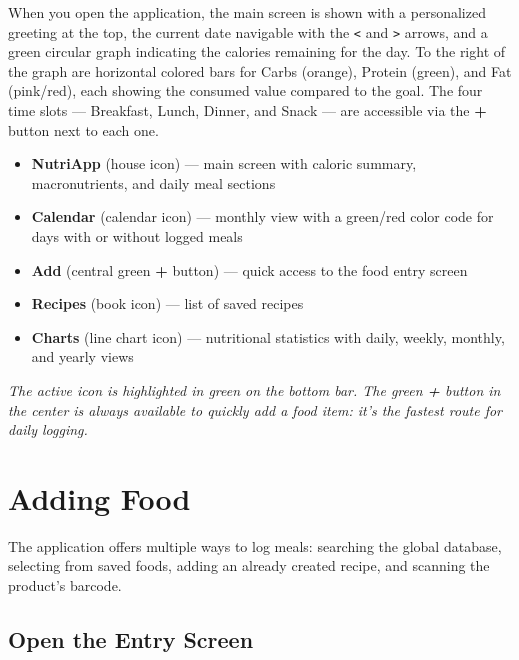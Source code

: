 \documentclass[a4paper,12pt]{article}
\newcommand{\labelgreen}[1]{\medskip\noindent{\color{nutriaccent}\textbf{#1}}\par\smallskip}
\newcommand{\suggerimento}[1]{%
  \smallskip\noindent\textit{\color{nutrigray}#1}\par\smallskip%
}
\begin{document}
\labelgreen{Description}
When you open the application, the main screen is shown with a
personalized greeting at the top, the current date navigable with the \texttt{<} and \texttt{>} arrows,
and a green circular graph indicating the calories remaining for the day.
To the right of the graph are horizontal colored bars for Carbs (orange),
Protein (green), and Fat (pink/red), each showing the consumed value compared to the goal.
The four time slots --- Breakfast, Lunch, Dinner, and Snack --- are
accessible via the \textbf{+} button next to each one.

\labelgreen{Bar Elements}
\begin{itemize}[leftmargin=1.4em, itemsep=2pt]
  \item \textbf{NutriApp} (house icon) --- main screen with caloric
        summary, macronutrients, and daily meal sections
  \item \textbf{Calendar} (calendar icon) --- monthly view with a green/red color
        code for days with or without logged meals
  \item \textbf{Add} (central green \textbf{+} button) --- quick access
        to the food entry screen
  \item \textbf{Recipes} (book icon) --- list of saved recipes
  \item \textbf{Charts} (line chart icon) --- nutritional statistics
        with daily, weekly, monthly, and yearly views
\end{itemize}

\suggerimento{The active icon is highlighted in green on the bottom bar.
The green \textbf{+} button in the center is always available to quickly add
a food item: it's the fastest route for daily logging.}

\newpage

\section{Adding Food}

The application offers multiple ways to log meals: searching the global database,
selecting from saved foods, adding an already created recipe, and
scanning the product's barcode.

\subsection{Open the Entry Screen}
\end{document}
